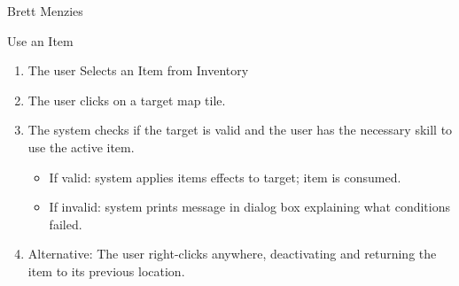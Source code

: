 \documentclass[12pt]{report}
\begin{document}
\begin{section}{Brett Menzies}
\begin{subsection}{Use an Item}
\begin{enumerate}
	\item The user Selects an Item from Inventory
	\item The user clicks on a target map tile.
	\item The system checks if the target is valid and the user has the necessary skill to use the active item.
	\begin{itemize}
		\item If valid: system applies items effects to target; item is consumed.
		\item If invalid:  system prints message in dialog box explaining what conditions failed.
	\end{itemize}
	\item Alternative: The user right-clicks anywhere, deactivating and returning the item to its previous location.
\end{enumerate}

\end{subsection}

\end{section}
\end{document}
